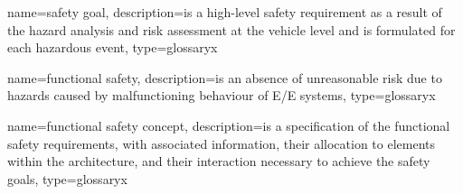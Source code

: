 {
    name={safety goal},
    description={is a high-level safety requirement as a result of the hazard analysis and risk assessment at the vehicle level and is formulated for each hazardous event},
    type=glossaryx
}

{
    name={functional safety},
    description={is an absence of unreasonable risk due to hazards caused by malfunctioning behaviour of E/E systems},
    type=glossaryx
}

{
    name={functional safety concept},
    description={is a specification of the functional safety requirements, with associated information, their allocation to elements within the architecture, and their interaction necessary to achieve the safety goals},
    type=glossaryx
}


